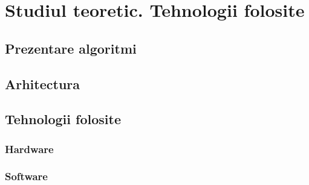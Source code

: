 \chapter{Studiul teoretic. Tehnologii folosite}\label{ch:2studiu_teoretic}
\section{Prezentare algoritmi}
\section{Arhitectura}
\section{Tehnologii folosite}
\subsection{Hardware}
\subsection{Software}